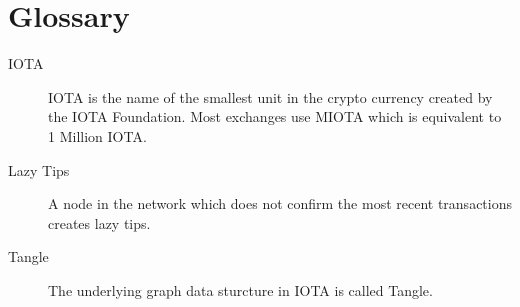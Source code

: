 \chapter*{Glossary}


\begin{description}
  \item[IOTA] IOTA is the name of the smallest unit in the crypto currency created by the IOTA Foundation. Most exchanges use MIOTA which is equivalent to 1 Million IOTA.
  \item[Lazy Tips] A node in the network which does not confirm the most recent transactions creates lazy tips.
  \item[Tangle] The underlying graph data sturcture in IOTA is called Tangle.
\end{description}
